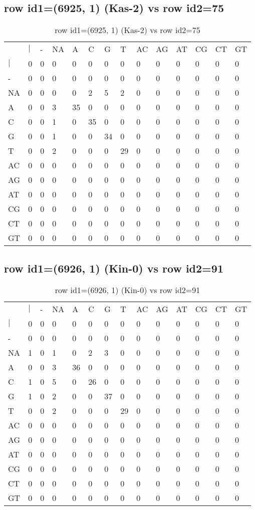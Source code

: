 \subsection{row id1=(6925, 1) (Kas-2) vs row id2=75}
\begin{center}
\begin{longtable}{|l|l|l|l|l|l|l|l|l|l|l|l|l|l|}
\caption{row id1=(6925, 1) (Kas-2) vs row id2=75} \label{table_dm116}\\
\hline
\\
\hline
&$|$&-&NA&A&C&G&T&AC&AG&AT&CG&CT&GT\\
$|$&0&0&0&0&0&0&0&0&0&0&0&0&0\\
-&0&0&0&0&0&0&0&0&0&0&0&0&0\\
NA&0&0&0&0&2&5&2&0&0&0&0&0&0\\
A&0&0&3&35&0&0&0&0&0&0&0&0&0\\
C&0&0&1&0&35&0&0&0&0&0&0&0&0\\
G&0&0&1&0&0&34&0&0&0&0&0&0&0\\
T&0&0&2&0&0&0&29&0&0&0&0&0&0\\
AC&0&0&0&0&0&0&0&0&0&0&0&0&0\\
AG&0&0&0&0&0&0&0&0&0&0&0&0&0\\
AT&0&0&0&0&0&0&0&0&0&0&0&0&0\\
CG&0&0&0&0&0&0&0&0&0&0&0&0&0\\
CT&0&0&0&0&0&0&0&0&0&0&0&0&0\\
GT&0&0&0&0&0&0&0&0&0&0&0&0&0\\
\hline
\end{longtable}
\end{center}

\subsection{row id1=(6926, 1) (Kin-0) vs row id2=91}
\begin{center}
\begin{longtable}{|l|l|l|l|l|l|l|l|l|l|l|l|l|l|}
\caption{row id1=(6926, 1) (Kin-0) vs row id2=91} \label{table_dm118}\\
\hline
\\
\hline
&$|$&-&NA&A&C&G&T&AC&AG&AT&CG&CT&GT\\
$|$&0&0&0&0&0&0&0&0&0&0&0&0&0\\
-&0&0&0&0&0&0&0&0&0&0&0&0&0\\
NA&1&0&1&0&2&3&0&0&0&0&0&0&0\\
A&0&0&3&36&0&0&0&0&0&0&0&0&0\\
C&1&0&5&0&26&0&0&0&0&0&0&0&0\\
G&1&0&2&0&0&37&0&0&0&0&0&0&0\\
T&0&0&2&0&0&0&29&0&0&0&0&0&0\\
AC&0&0&0&0&0&0&0&0&0&0&0&0&0\\
AG&0&0&0&0&0&0&0&0&0&0&0&0&0\\
AT&0&0&0&0&0&0&0&0&0&0&0&0&0\\
CG&0&0&0&0&0&0&0&0&0&0&0&0&0\\
CT&0&0&0&0&0&0&0&0&0&0&0&0&0\\
GT&0&0&0&0&0&0&0&0&0&0&0&0&0\\
\hline
\end{longtable}
\end{center}

